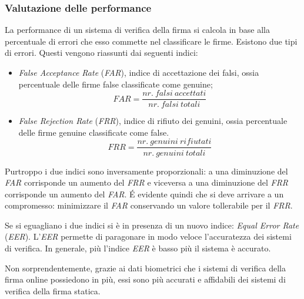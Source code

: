 \subsubsection{Valutazione delle performance}
\label{2.1.1}
La performance di un sistema di verifica della firma si calcola in base alla percentuale di errori che esso commette nel classificare le firme. Esistono due tipi di errori. Questi vengono riassunti dai seguenti indici:
\begin{itemize}
\item \emph{False Acceptance Rate} (\emph{FAR}), indice di accettazione dei falsi, ossia percentuale delle firme false classificate come genuine;
\[FAR =
\frac{nr.\ falsi\ accettati}{nr.\ falsi\ totali}
\]
\item \emph{False Rejection Rate} (\emph{FRR}), indice di rifiuto dei genuini, ossia percentuale delle firme genuine classificate come false.
\[FRR =
\frac{nr.\ genuini\ rifiutati}{nr.\ genuini\ totali}
\]
\end{itemize}
Purtroppo i due indici sono inversamente proporzionali: a una diminuzione del \emph{FAR} corrisponde un aumento del \emph{FRR} e viceversa a una diminuzione del \emph{FRR} corrisponde un aumento del \emph{FAR}. \'{E} evidente quindi che si deve arrivare a un compromesso: minimizzare il \emph{FAR} conservando un valore tollerabile per il \emph{FRR}.

Se si eguagliano i due indici si è in presenza di un nuovo indice: \emph{Equal Error Rate} (\emph{EER}). L'\emph{EER} permette di paragonare in modo veloce l'accuratezza dei sistemi di verifica. In generale, più l'indice \emph{EER} è basso più il sistema è accurato.

Non sorprendentemente, grazie ai dati biometrici che i sistemi di verifica della firma online possiedono in più, essi sono più accurati e affidabili dei sistemi di verifica della firma statica.


